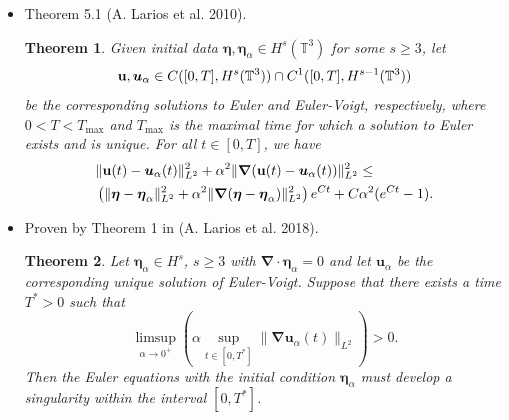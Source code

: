 \documentclass{beamer}
\newtheorem{thm}{Theorem}[section]
\def\Bmp#1{ \begin{minipage}{#1} }
\def\Emp{ \end{minipage} }
\def\TT{{\mathbb{T}}}
\def\bn{{\boldsymbol \nabla}}
\def\be{{\boldsymbol \eta}}
\def\bea{{\boldsymbol \eta_\alpha}}
\def\u{{\bf u}}
\def\ua{\boldsymbol u_\alpha}
\begin{document}
\frame
{
\hspace*{-1.0cm}
\Bmp{12cm}
\raggedright

\begin{itemize}
\item<1-> Theorem 5.1 (A. Larios et al. 2010).
\begin{thm}\label{thm:Theorem:1.2}
Given initial data $\be,\bea \in H^s(\TT^3)$ for some $s\geq 3$, let
$$\u,\ua \in C([0,T],H^s(\TT^3)) \cap C^1([0,T],H^{s-1}(\TT^3))$$
be the corresponding solutions to Euler and Euler-Voigt, respectively, where $0<T<T_{\text{max}}$ and $T_{\text{max}}$ is the maximal time for which a solution to Euler exists and is unique. For all $t\in[0,T]$, we have 
\begin{subequations}
\begin{align*}
&\|\u(t)-\ua(t)\|_{L^2}^2 + \alpha^2\|\bn(\u(t)-\ua(t))\|_{L^2}^2 \leq \\ 
&\left( \|\be-\bea \|_{L^2}^2 + \alpha^2\|\bn(\be - \bea)\|_{L^2}^2 \right)e^{Ct} + C\alpha^2(e^{Ct}-1).
\end{align*}
\end{subequations}
\end{thm}

\end{itemize}
\Emp
}

\frame
{
\hspace*{-1.0cm}
\Bmp{12cm}
\raggedright

\begin{itemize}
\item<1-> Proven by Theorem 1 in (A. Larios et al. 2018).
\begin{thm}\label{thm:Theorem:1.1}
Let $\bea\in H^s$, $s\geq 3$ with $\bn \cdot \bea = 0$ and let $\ua$ be the corresponding unique solution of Euler-Voigt. Suppose that there exists a time $T^*>0$ such that
\begin{equation*}
\limsup_{\alpha \rightarrow 0^+} \left( \alpha \sup_{t\in[0,T^*]} \|\bn \ua(t)\|_{L^2}\right) > 0.
\end{equation*}
Then the Euler equations with the initial condition $\be_\alpha$ must develop a singularity within the interval $[0,T^*]$.
\end{thm}

\end{itemize}
\Emp
}
\end{document}
